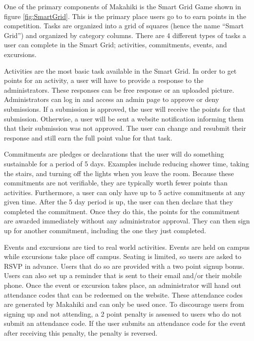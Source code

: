 \documentclass{acm_proc_article-sp}
\begin{document}
One of the primary components of Makahiki is the Smart Grid Game shown in figure \ref{fig:SmartGrid}. This is the primary place users go to to earn points in the competition. Tasks are organized into a grid of squares (hence the name ``Smart Grid'') and organized by category columns. There are 4 different types of tasks a user can complete in the Smart Grid; activities, commitments, events, and excursions.

Activities are the most basic task available in the Smart Grid. In order to get points for an activity, a user will have to provide a response to the administrators. These responses can be free response or an uploaded picture. Administrators can log in and access an admin page to approve or deny submissions. If a submission is approved, the user will receive the points for that submission. Otherwise, a user will be sent a website notification informing them that their submission was not approved. The user can change and resubmit their response and still earn the full point value for that task.

Commitments are pledges or declarations that the user will do something sustainable for a period of 5 days. Examples include reducing shower time, taking the stairs, and turning off the lights when you leave the room. Because these commitments are not verifiable, they are typically worth fewer points than activities. Furthermore, a user can only have up to 5 active commitments at any given time. After the 5 day period is up, the user can then declare that they completed the commitment. Once they do this, the points for the commitment are awarded immediately without any administrator approval. They can then sign up for another commitment, including the one they just completed.

Events and excursions are tied to real world activities. Events are held on campus while excursions take place off campus. Seating is limited, so users are asked to RSVP in advance. Users that do so are provided with a two point signup bonus. Users can also set up a reminder that is sent to their email and/or their mobile phone. Once the event or excursion takes place, an administrator will hand out attendance codes that can be redeemed on the website. These attendance codes are generated by Makahiki and can only be used once. To discourage users from signing up and not attending, a 2 point penalty is assessed to users who do not submit an attendance code. If the user submits an attendance code for the event after receiving this penalty, the penalty is reversed.
\end{document}
